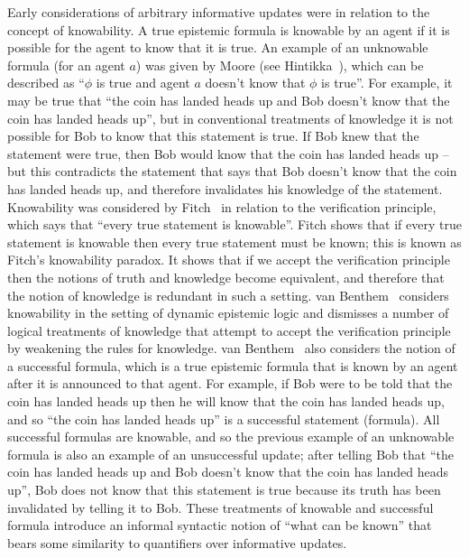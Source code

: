 Early considerations of arbitrary informative updates were in relation to the
concept of knowability. A true epistemic formula is knowable by an agent if it
is possible for the agent to know that it is true. An example of an unknowable
formula (for an agent $a$) was given by Moore (see
Hintikka~\cite{hintikka:1962}), which can be described as ``$\phi$ is true and
agent $a$ doesn't know that $\phi$ is true''. For example, it may be true that
``the coin has landed heads up and Bob doesn't know that the coin has landed
heads up'', but in conventional treatments of knowledge it is not possible for
Bob to know that this statement is true. If Bob knew that the statement were
true, then Bob would know that the coin has landed heads up -- but this
contradicts the statement that says that Bob doesn't know that the coin has
landed heads up, and therefore invalidates his knowledge of the statement.
Knowability was considered by Fitch~\cite{fitch:1963} in relation to the
verification principle, which says that ``every true statement is knowable''. Fitch
shows that if every true statement is knowable then every true statement must be
known; this is known as Fitch's knowability paradox. It shows that if we accept
the verification principle then the notions of truth and knowledge become
equivalent, and therefore that the notion of knowledge is redundant in such a
setting. van Benthem~\cite{vanbenthem:2004} considers knowability in the setting
of dynamic epistemic logic and dismisses a number of logical treatments of
knowledge that attempt to accept the verification principle by weakening the
rules for knowledge. van Benthem~\cite{vanbenthem:2004} also considers the notion
of a successful formula, which is a true epistemic formula that is known by an
agent after it is announced to that agent. For example, if Bob were to be told
that the coin has landed heads up then he will know that the coin has landed
heads up, and so ``the coin has landed heads up'' is a successful statement
(formula). All successful formulas are knowable, and so the previous example of
an unknowable formula is also an example of an unsuccessful update; after
telling Bob that ``the coin has landed heads up and Bob doesn't know that the
coin has landed heads up'', Bob does not know that this statement is true
because its truth has been invalidated by telling it to Bob. These treatments of
knowable and successful formula introduce an informal syntactic notion of ``what
can be known'' that bears some similarity to quantifiers over informative
updates.

